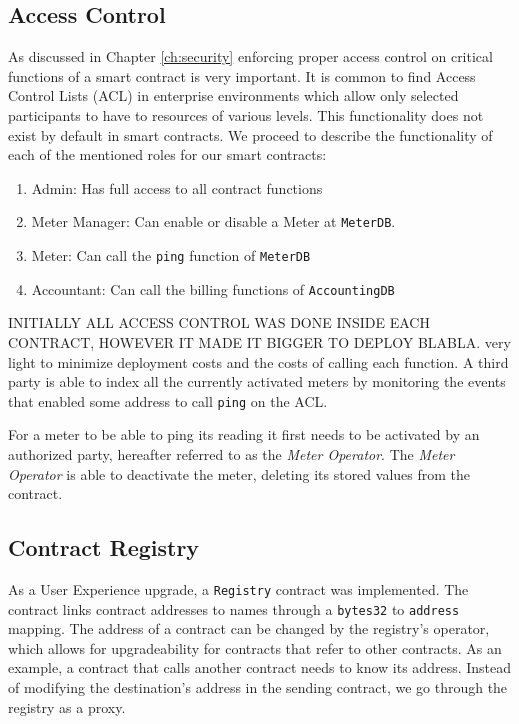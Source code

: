 \subsection{Access Control}
As discussed in Chapter \ref{ch:security} enforcing proper access control on critical functions of a smart contract is very important. It is common to find Access Control Lists (ACL) in enterprise environments which allow only selected participants to have to resources of various levels. This functionality does not exist by default in smart contracts. We proceed to describe the functionality of each of the mentioned roles for our smart contracts:
\begin{enumerate}
    \item Admin: Has full access to all contract functions
    \item Meter Manager: Can enable or disable a Meter at \texttt{MeterDB}.
    \item Meter: Can call the \texttt{ping} function of \texttt{MeterDB}
    \item Accountant: Can call the billing functions of \texttt{AccountingDB}
\end{enumerate}

INITIALLY ALL ACCESS CONTROL WAS DONE INSIDE EACH CONTRACT, HOWEVER IT MADE IT BIGGER TO DEPLOY BLABLA.
very light to minimize deployment costs and the costs of calling each function. A third party is able to index all the currently activated meters by monitoring the events that enabled some address to call \texttt{ping} on the ACL.

For a meter to be able to ping its reading it first needs to be activated by an authorized party, hereafter referred to as the \textit{Meter Operator}. The \textit{Meter Operator} is able to deactivate the meter, deleting its stored values from the contract. 

\subsection{Contract Registry} As a User Experience upgrade, a \texttt{Registry} contract was implemented. The contract links contract addresses to names through a \texttt{bytes32} to \texttt{address} mapping. The address of a contract can be changed by the registry's operator, which allows for upgradeability for contracts that refer to other contracts. As an example, a contract that calls another contract needs to know its address. Instead of modifying the destination's address in the sending contract, we go through the registry as a proxy.

